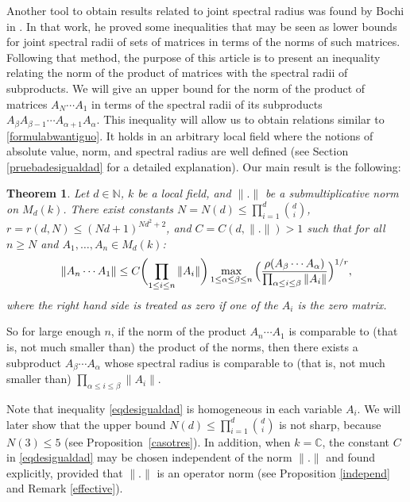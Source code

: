 \documentclass[JEP,XML,SOM,Unicode,NoEqCountersInSection]{cedram}
\theoremstyle{plain}
\newtheorem{teo}{Theorem}[section]
\theoremstyle{definition}
\newcommand{\NN}{\mathbb{N}}
\newcommand{\CC}{\mathbb{C}}
\begin{document}
Another tool to obtain results related to joint spectral radius was found by Bochi in \cite{bociineq}. In that work, he proved some inequalities that may be seen as lower bounds for joint spectral radii of sets of matrices in terms of the norms of such matrices. Following that method, the purpose of this article is to present an inequality relating the norm of the product of matrices with the spectral radii of subproducts. We will give an upper bound for the norm of the product of matrices $A_N\cdots A_1$ in terms of the spectral radii of its subproducts $A_{\beta}A_{\beta-1}\cdots A_{\alpha+1}A_{\alpha}$. This inequality will allow us to obtain relations similar to \eqref{formulabwantiguo}. It holds in an arbitrary local field where the notions of absolute value, norm, and spectral radius are well defined (see Section \ref{pruebadesigualdad} for a detailed explanation). Our main result is the following:

\begin{teo}\label{desigualdad} Let $d \in \NN$, $k$ be a local field, and $\|.\|$ be a submultiplicative norm on $M_{d}(k)$. There exist constants $N = N(d)\leq \prod^{d}_{i=1}{\binom{d}{i}}$, $r = r(d,N) \leq (Nd+1)^{Nd^2+2}$, and $C = C(d,\|.\|) > 1$ such that for all $n\geq N$ and $A_1,\dots, A_n \in M_{d}(k)$:
\begin{equation}\label{eqdesigualdad}
\|A_n\cdots A_1\| \leq C \biggl(\prod_{1\leq i\leq n}{\|A_i\|}\biggr)\max_{1\leq \alpha\leq \beta\leq n}{ \Bigl( \frac{\rho(A_{\beta}\cdots A_{\alpha}) }{ \prod_{\alpha\leq i\leq \beta}{\|A_i\|}} \Bigr)^{1/r}},
\end{equation}
where the right hand side is treated as zero if one of the $A_{i}$ is the zero matrix.
\end{teo}
So for large enough $n$, if the norm of the product $A_n\cdots A_1$ is comparable to (that is, not much smaller than) the product of the norms, then there exists a subproduct $A_{\beta}\cdots A_{\alpha}$ whose spectral radius is comparable to (that is, not much smaller than) $\prod_{\alpha\leq i \leq \beta}{\|A_{i}\|}$.

Note that inequality \eqref{eqdesigualdad} is homogeneous in each variable $A_{i}$. We will later show that the upper bound $N(d)\leq \prod^{d}_{i=1}{\binom{d}{i}}$ is not sharp, because $N(3)\leq 5$ (see Proposition~\ref{casotres}). In addition, when $k=\CC$, the constant $C$ in \eqref{eqdesigualdad} may be chosen independent of the norm $\|.\|$ and found explicitly, provided that $\|.\|$ is an operator norm (see Proposition \ref{independ} and Remark \ref{effective}).
\end{document}
